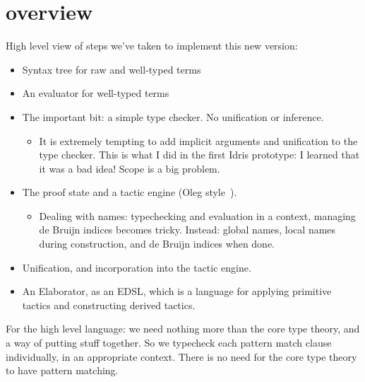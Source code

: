 \section{overview}

High level view of steps we've taken to implement this new version:

\begin{itemize}
\item Syntax tree for raw and well-typed terms
\item An evaluator for well-typed terms
\item The important bit: a simple type checker. No unification or
  inference.
\begin{itemize}
  \item It is extremely tempting to add implicit arguments and unification to the
        type checker. This is what I did in the first Idris prototype: I learned
        that it was a bad idea! Scope is a big problem.
\end{itemize}
\item The proof state and a tactic engine (Oleg style~\cite{mcbride-thesis}).
\begin{itemize}
  \item Dealing with names: typechecking and evaluation in a context, managing de Bruijn
        indices becomes tricky. Instead: global names, local names during construction,
        and de Bruijn indices when done.
\end{itemize}
\item Unification, and incorporation into the tactic engine.
\item An Elaborator, as an EDSL, which is a language for applying primitive tactics and
      constructing derived tactics.
\end{itemize}

For the high level language: we need nothing more than the core type theory,
and a way of putting stuff together. So we typecheck each pattern match clause
individually, in an appropriate context. There is no need for the core type
theory to have pattern matching.
